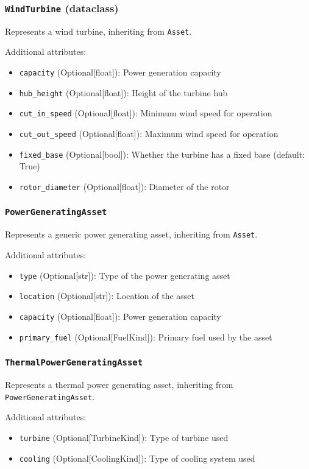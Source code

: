 \documentclass{article}
\begin{document}
\subsubsection{\texttt{WindTurbine} (dataclass)}
Represents a wind turbine, inheriting from \texttt{Asset}.

Additional attributes:
\begin{itemize}
    \item \texttt{capacity} (Optional[float]): Power generation capacity
    \item \texttt{hub\_height} (Optional[float]): Height of the turbine hub
    \item \texttt{cut\_in\_speed} (Optional[float]): Minimum wind speed for operation
    \item \texttt{cut\_out\_speed} (Optional[float]): Maximum wind speed for operation
    \item \texttt{fixed\_base} (Optional[bool]): Whether the turbine has a fixed base (default: True)
    \item \texttt{rotor\_diameter} (Optional[float]): Diameter of the rotor
\end{itemize}

\subsubsection{\texttt{PowerGeneratingAsset}}
Represents a generic power generating asset, inheriting from \texttt{Asset}.

Additional attributes:
\begin{itemize}
    \item \texttt{type} (Optional[str]): Type of the power generating asset
    \item \texttt{location} (Optional[str]): Location of the asset
    \item \texttt{capacity} (Optional[float]): Power generation capacity
    \item \texttt{primary\_fuel} (Optional[FuelKind]): Primary fuel used by the asset
\end{itemize}

\subsubsection{\texttt{ThermalPowerGeneratingAsset}}
Represents a thermal power generating asset, inheriting from \texttt{PowerGeneratingAsset}.

Additional attributes:
\begin{itemize}
    \item \texttt{turbine} (Optional[TurbineKind]): Type of turbine used
    \item \texttt{cooling} (Optional[CoolingKind]): Type of cooling system used
\end{itemize}
\end{document}
